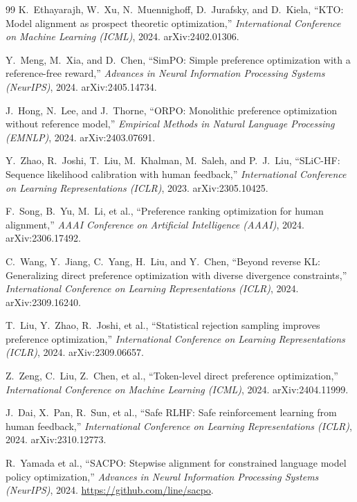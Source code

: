 \documentclass[12pt,a4paper,UTF8]{ctexart}
\begin{document}
\begin{thebibliography}{99}
K.~Ethayarajh, W.~Xu, N.~Muennighoff, D.~Jurafsky, and D.~Kiela,
``KTO: Model alignment as prospect theoretic optimization,''
\textit{International Conference on Machine Learning (ICML)},
2024. arXiv:2402.01306.

Y.~Meng, M.~Xia, and D.~Chen,
``SimPO: Simple preference optimization with a reference-free reward,''
\textit{Advances in Neural Information Processing Systems (NeurIPS)},
2024. arXiv:2405.14734.

J.~Hong, N.~Lee, and J.~Thorne,
``ORPO: Monolithic preference optimization without reference model,''
\textit{Empirical Methods in Natural Language Processing (EMNLP)},
2024. arXiv:2403.07691.

Y.~Zhao, R.~Joshi, T.~Liu, M.~Khalman, M.~Saleh, and P.~J.~Liu,
``SLiC-HF: Sequence likelihood calibration with human feedback,''
\textit{International Conference on Learning Representations (ICLR)},
2023. arXiv:2305.10425.

F.~Song, B.~Yu, M.~Li, et al.,
``Preference ranking optimization for human alignment,''
\textit{AAAI Conference on Artificial Intelligence (AAAI)},
2024. arXiv:2306.17492.

C.~Wang, Y.~Jiang, C.~Yang, H.~Liu, and Y.~Chen,
``Beyond reverse KL: Generalizing direct preference optimization with diverse divergence constraints,''
\textit{International Conference on Learning Representations (ICLR)},
2024. arXiv:2309.16240.

T.~Liu, Y.~Zhao, R.~Joshi, et al.,
``Statistical rejection sampling improves preference optimization,''
\textit{International Conference on Learning Representations (ICLR)},
2024. arXiv:2309.06657.

Z.~Zeng, C.~Liu, Z.~Chen, et al.,
``Token-level direct preference optimization,''
\textit{International Conference on Machine Learning (ICML)},
2024. arXiv:2404.11999.

J.~Dai, X.~Pan, R.~Sun, et al.,
``Safe RLHF: Safe reinforcement learning from human feedback,''
\textit{International Conference on Learning Representations (ICLR)},
2024. arXiv:2310.12773.

R.~Yamada et al.,
``SACPO: Stepwise alignment for constrained language model policy optimization,''
\textit{Advances in Neural Information Processing Systems (NeurIPS)},
2024. \url{https://github.com/line/sacpo}.


\end{thebibliography}
\end{document}
